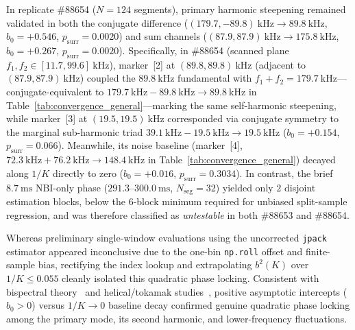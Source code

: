In replicate \#88654 ($N = 124$ segments), primary harmonic steepening remained validated in both the conjugate difference ($(179.7, -89.8)~\mathrm{kHz}\to 89.8~\mathrm{kHz}$, $b_0 = +0.546$, $p_{\mathrm{surr}} = 0.0020$) and sum channels ($(87.9, 87.9)~\mathrm{kHz}\to 175.8~\mathrm{kHz}$, $b_0 = +0.267$, $p_{\mathrm{surr}} = 0.0020$). Specifically, in \#88654 (scanned plane $f_1, f_2 \in [11.7, 99.6]~\mathrm{kHz}$), marker~[2] at $(89.8, 89.8)~\mathrm{kHz}$ (adjacent to $(87.9, 87.9)~\mathrm{kHz}$) coupled the $89.8~\mathrm{kHz}$ fundamental with $f_1+f_2=179.7~\mathrm{kHz}$---conjugate-equivalent to $179.7~\mathrm{kHz} -89.8 ~\mathrm{kHz}\to 89.8~\mathrm{kHz}$ in Table~\ref{tab:convergence_general}---marking the same self-harmonic steepening, while marker~[3] at $(19.5, 19.5)~\mathrm{kHz}$ corresponded via conjugate symmetry to the marginal sub-harmonic triad $39.1~\mathrm{kHz} -19.5~\mathrm{kHz}\to 19.5~\mathrm{kHz}$ ($b_0=+0.154$, $p_{\mathrm{surr}}=0.066$). Meanwhile, its noise baseline (marker~[4], $72.3 ~\mathrm{kHz} + 76.2 ~\mathrm{kHz}\to 148.4~\mathrm{kHz}$ in Table~\ref{tab:convergence_general}) decayed along $1/K$ directly to zero ($b_0 = +0.016$, $p_{\mathrm{surr}} = 0.3034$). In contrast, the brief $8.7~\mathrm{ms}$ $\mathrm{NBI}$-only phase ($291.3\text{--}300.0~\mathrm{ms}$, $N_{\mathrm{seg}} = 32$) yielded only $2$ disjoint estimation blocks, below the $6$-block minimum required for unbiased split-sample regression, and was therefore classified as \emph{untestable} in both \#88653 and \#88654.

Whereas preliminary single-window evaluations using the uncorrected \texttt{jpack} estimator appeared inconclusive due to the one-bin \texttt{np.roll} offset and finite-sample bias, rectifying the index lookup and extrapolating $b^2(K)$ over $1/K \le 0.055$ cleanly isolated this quadratic phase locking. Consistent with bispectral theory~\cite{KimPowers1979} and helical/tokamak studies~\cite{Kin2025,Miyashita2025,Hou2019}, positive asymptotic intercepts ($b_0 > 0$) versus $1/K \to 0$ baseline decay confirmed genuine quadratic phase locking among the primary mode, its second harmonic, and lower-frequency fluctuations.

